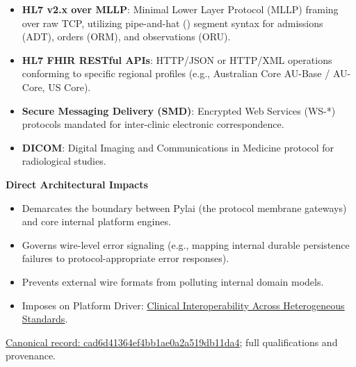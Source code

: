 \begin{itemize}


\item \textbf{HL7 v2.x over MLLP}: Minimal Lower Layer Protocol (MLLP) framing over raw TCP, utilizing pipe-and-hat (\texttt{}) segment syntax for admissions (ADT), orders (ORM), and observations (ORU).

\item \textbf{HL7 FHIR RESTful APIs}: HTTP/JSON or HTTP/XML operations conforming to specific regional profiles (e.g., Australian Core AU-Base / AU-Core, US Core).

\item \textbf{Secure Messaging Delivery (SMD)}: Encrypted Web Services (WS-*) protocols mandated for inter-clinic electronic correspondence.

\item \textbf{DICOM}: Digital Imaging and Communications in Medicine protocol for radiological studies.

\end{itemize}


\par\medskip\textbf{Direct Architectural Impacts}\par


\begin{itemize}


\item Demarcates the boundary between Pylai (the protocol membrane gateways) and core internal platform engines.

\item Governs wire-level error signaling (e.g., mapping internal durable persistence failures to protocol-appropriate error responses).

\item Prevents external wire formats from polluting internal domain models.

\item Imposes on Platform Driver: \href{\detokenize{../../../../../../../../docs/markdown/01-motivation/drivers-assessments/drivers.md}}{Clinical Interoperability Across Heterogeneous Standards}.

\end{itemize}

{\footnotesize \href{../../../../../../../continuum/motivation/constraint/cad6d41364ef4bb1ae0a2a519db11da4.md}{Canonical record: cad6d41364ef4bb1ae0a2a519db11da4}; full qualifications and provenance.}\par

